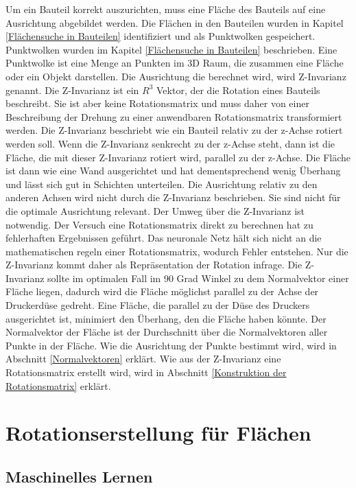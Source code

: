 Um ein Bauteil korrekt auszurichten, muss eine Fläche des Bauteils auf eine Ausrichtung abgebildet werden. Die Flächen in den Bauteilen wurden in Kapitel \ref{Flächensuche in  Bauteilen} identifiziert und als Punktwolken gespeichert.
Punktwolken wurden im Kapitel \ref{Flächensuche in  Bauteilen} beschrieben. Eine Punktwolke ist eine Menge an Punkten im 3D Raum, die zusammen eine Fläche oder ein Objekt darstellen.
Die Ausrichtung die berechnet wird, wird Z-Invarianz genannt. Die Z-Invarianz ist ein $R^{3}$ Vektor, der die Rotation eines Bauteils beschreibt. Sie ist aber keine Rotationsmatrix und muss daher von einer Beschreibung der Drehung zu einer anwendbaren Rotationsmatrix transformiert werden.
Die Z-Invarianz beschriebt wie ein Bauteil relativ zu der z-Achse rotiert werden soll. Wenn die Z-Invarianz senkrecht zu der z-Achse steht, dann ist die Fläche, die mit dieser Z-Invarianz rotiert wird, parallel zu der z-Achse. 
Die Fläche ist dann wie eine Wand ausgerichtet und hat dementsprechend wenig Überhang und lässt sich gut in Schichten unterteilen.
Die Ausrichtung relativ zu den anderen Achsen wird nicht durch die Z-Invarianz beschrieben. Sie sind nicht für die optimale Ausrichtung relevant.
Der Umweg über die Z-Invarianz ist notwendig. Der Versuch eine Rotationsmatrix direkt zu berechnen hat zu fehlerhaften Ergebnissen geführt. Das neuronale Netz hält sich nicht an die mathematischen regeln einer Rotationsmatrix, wodurch Fehler entstehen. 
Nur die Z-Invarianz kommt daher als Repräsentation der Rotation infrage.
Die Z-Invarianz sollte im optimalen Fall im 90 Grad Winkel zu dem Normalvektor einer Fläche liegen, dadurch wird die Fläche möglichst parallel zu der Achse der Druckerdüse gedreht. Eine Fläche, die parallel zu der Düse des Druckers ausgerichtet ist, 
minimiert den Überhang, den die Fläche haben könnte. Der Normalvektor der Fläche ist der Durchschnitt über die Normalvektoren aller Punkte in der Fläche. Wie die Ausrichtung der Punkte bestimmt wird, wird in Abschnitt \ref{Normalvektoren} erklärt.
Wie aus der Z-Invarianz eine Rotationsmatrix erstellt wird, wird in Abschnitt \ref{Konstruktion der Rotationsmatrix} erklärt. 

\section{Rotationserstellung für Flächen}
\label{Punktwolken Transformation}

\subsection{Maschinelles Lernen}
\label{Maschinelles Lernen}

